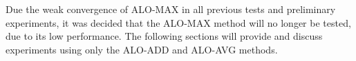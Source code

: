 %   


Due the weak convergence of ALO-MAX in all previous tests and preliminary experiments, it was decided that the ALO-MAX method will no longer be tested, due to its low performance.
The following sections will provide and discuss experiments using only the ALO-ADD and ALO-AVG methods.

